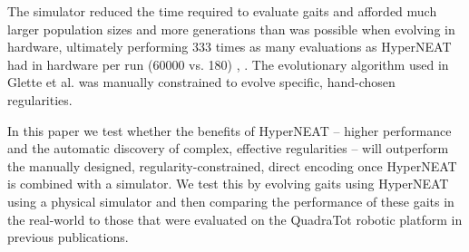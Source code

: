 The simulator reduced the time required to evaluate gaits and afforded much larger population sizes and more generations than was possible when evolving in hardware, ultimately performing 333 times as many evaluations as HyperNEAT had in hardware per run (60000 vs. 180) \cite{yos:clune}, \cite{glette}. 
The evolutionary algorithm used in Glette et al. \cite{glette} was manually constrained to evolve specific, hand-chosen regularities. 

In this paper we test whether the benefits of HyperNEAT -- higher performance and the automatic discovery of complex, effective regularities \cite{clune2,yos:clune} -- will outperform the manually designed, regularity-constrained, direct encoding once HyperNEAT is combined with a simulator. %
We test this by evolving gaits using HyperNEAT using a physical simulator and then comparing the performance of these gaits in the real-world to those that were evaluated on the QuadraTot robotic platform in previous publications.  %

